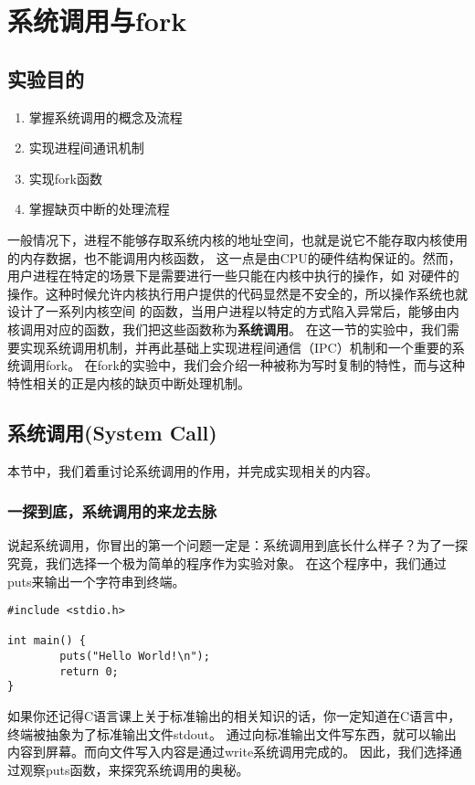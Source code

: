 \chapter{系统调用与fork}

\section{实验目的}
  \begin{enumerate}
    \item 掌握系统调用的概念及流程
    \item 实现进程间通讯机制
    \item 实现fork函数
    \item 掌握缺页中断的处理流程
  \end{enumerate}

一般情况下，进程不能够存取系统内核的地址空间，也就是说它不能存取内核使用的内存数据，也不能调用内核函数，
这一点是由CPU的硬件结构保证的。然而，用户进程在特定的场景下是需要进行一些只能在内核中执行的操作，如
对硬件的操作。这种时候允许内核执行用户提供的代码显然是不安全的，所以操作系统也就设计了一系列内核空间
的函数，当用户进程以特定的方式陷入异常后，能够由内核调用对应的函数，我们把这些函数称为\textbf{系统调用}。
在这一节的实验中，我们需要实现系统调用机制，并再此基础上实现进程间通信（IPC）机制和一个重要的系统调用fork。
在fork的实验中，我们会介绍一种被称为写时复制的特性，而与这种特性相关的正是内核的缺页中断处理机制。

\section{系统调用(System Call)}
本节中，我们着重讨论系统调用的作用，并完成实现相关的内容。

\subsection{一探到底，系统调用的来龙去脉}
说起系统调用，你冒出的第一个问题一定是：系统调用到底长什么样子？为了一探究竟，我们选择一个极为简单的程序作为实验对象。
在这个程序中，我们通过puts来输出一个字符串到终端。

\begin{verbatim}
#include <stdio.h>

int main() {
        puts("Hello World!\n");
        return 0;
}
\end{verbatim}

\begin{note}
如果你还记得C语言课上关于标准输出的相关知识的话，你一定知道在C语言中，终端被抽象为了标准输出文件stdout。
通过向标准输出文件写东西，就可以输出内容到屏幕。而向文件写入内容是通过write系统调用完成的。
因此，我们选择通过观察puts函数，来探究系统调用的奥秘。
\end{note}

